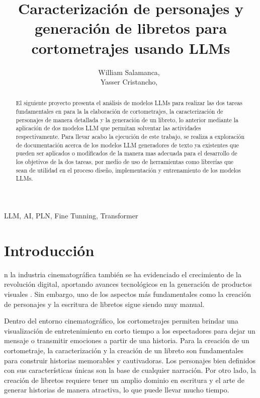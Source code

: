 \documentclass[journal,onecolumn]{IEEEtran}
\begin{document}
		
	
	
		\title{Caracterización de personajes y generación de libretos para cortometrajes usando LLMs}
	
		
		\author{William Salamanca,~\\
			Yasser Cristancho,~}%
		
	\maketitle
	
	
\begin{abstract}
		El siguiente proyecto presenta el análisis de modelos LLMs para realizar las dos tareas fundamentales en para la la elaboración de cortometrajes, la caracterización de personajes de manera detallada y la generación de un libreto, lo anterior mediante la  aplicación de dos modelos LLM que permitan solventar las actividades respectivamente. Para llevar acabo la ejecución de este trabajo, se realiza a exploración de documentación acerca de los modelos LLM generadores de texto ya existentes que pueden ser aplicados o modificados de la manera mas adecuada para el desarrollo de los objetivos de la dos tareas, por medio de uso de herramientas como librerías que sean de utilidad en el proceso diseño, implementación y entrenamiento de los modelos LLMs.
	\end{abstract}
	
	
	\begin{IEEEkeywords}
		LLM, AI, PLN, Fine Tunning, Transformer
	\end{IEEEkeywords}
	
	\IEEEpeerreviewmaketitle
	
	
	
	\section{Introducción}

	n la industria cinematográfica también se ha evidenciado el crecimiento de la revolución digital, aportando avances tecnológicos en la generación de productos visuales \cite{article-1}. Sin embargo, uno de los aspectos más fundamentales como la creación de personajes y la escritura de libretos sigue siendo muy manual.
	
	Dentro del entorno cinematográfico, los cortometrajes permiten brindar una visualización de entretenimiento en corto tiempo a los espectadores para dejar un mensaje o transmitir emociones a partir de una historia. Para la creación de un cortometraje, la caracterización y la creación de un libreto son fundamentales para construir historias memorables y cautivadoras. Los personajes bien definidos con sus características únicas son la base de cualquier narración. Por otro lado, la creación de libretos requiere tener un amplio dominio en escritura y el arte de generar historias de manera atractiva, lo que puede llevar mucho tiempo.
	
\end{document}
